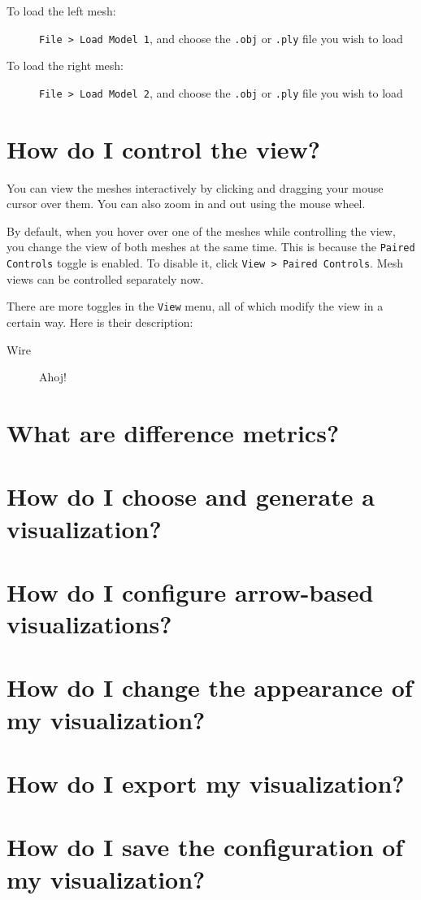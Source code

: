 \begin{description}
\item [To load the left mesh:] \verb+File > Load Model 1+, and choose the \verb+.obj+ or \verb+.ply+ file you wish to load
\item [To load the right mesh:] \verb+File > Load Model 2+, and choose the \verb+.obj+ or \verb+.ply+ file you wish to load
\end{description}

\section{How do I control the view?}

You can view the meshes interactively by clicking and dragging your mouse cursor over them. You can also zoom in and out using the mouse wheel.

By default, when you hover over one of the meshes while controlling the view, you change the view of both meshes at the same time. This is because the \verb+Paired Controls+ toggle is enabled. To disable it, click \verb+View > Paired Controls+. Mesh views can be controlled separately now.

There are more toggles in the \verb+View+ menu, all of which modify the view in a certain way. Here is their description:

\begin{description}
\item [Wire] Ahoj!
\end{description}

\section{What are difference metrics?}

\section{How do I choose and generate a visualization?}

\section{How do I configure arrow-based visualizations?}

\section{How do I change the appearance of my visualization?}

\section{How do I export my visualization?}

\section{How do I save the configuration of my visualization?}